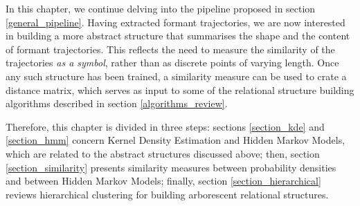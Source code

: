 \documentclass[../main.tex]{subfiles}
\begin{document}
 \label{chapter_hmms}
In this chapter, we continue delving into the pipeline proposed in section \ref{general_pipeline}. Having extracted formant trajectories, we are now interested in building a more abstract structure that summarises the shape and the content of formant trajectories. This reflects the need to measure the similarity of the trajectories \emph{as a symbol}, rather than as discrete points of varying length. Once any such structure has been trained, a similarity measure can be used to crate a distance matrix, which serves as input to some of the relational structure building algorithms described in section \ref{algorithms_review}.
\par Therefore, this chapter is divided in three steps: sections \ref{section_kde} and \ref{section_hmm} concern Kernel Density Estimation and Hidden Markov Models, which are related to the abstract structures discussed above; then, section \ref{section_similarity} presents similarity measures between probability densities and between Hidden Markov Models; finally, section \ref{section_hierarchical} reviews hierarchical clustering for building arborescent relational structures.
\end{document}
